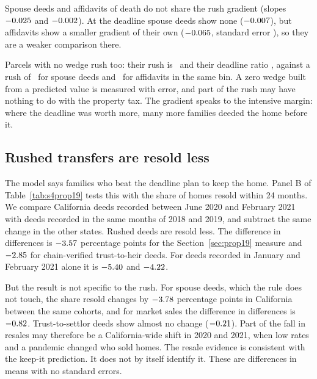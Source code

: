 Spouse deeds and affidavits of death do not share the rush gradient (slopes $-0.025$ and $-0.002$). At the deadline spouse deeds show none ($-0.007$), but affidavits show a smaller gradient of their own ($-0.065$, standard error \RTWODeadlineSlopeAffidavitSE), so they are a weaker comparison there.

Parcels with no wedge rush too: their rush is \RTWORushMainZero\ and their deadline ratio \RTWODeadlineMainZero, against a rush of \RTWORushSpouseZero\ for spouse deeds and \RTWORushAffidavitZero\ for affidavits in the same bin. A zero wedge built from a predicted value is measured with error, and part of the rush may have nothing to do with the property tax. The gradient speaks to the intensive margin: where the deadline was worth more, many more families deeded the home before it.

\subsection{Rushed transfers are resold less}\label{subsec:resale}

The model says families who beat the deadline plan to keep the home. Panel B of Table~\ref{tab:s4prop19} tests this with the share of homes resold within 24 months. We compare California deeds recorded between June 2020 and February 2021 with deeds recorded in the same months of 2018 and 2019, and subtract the same change in the other states. Rushed deeds are resold less. The difference in differences is $-3.57$ percentage points for the Section~\ref{sec:prop19} measure and $-2.85$ for chain-verified trust-to-heir deeds. For deeds recorded in January and February 2021 alone it is $-5.40$ and $-4.22$.



But the result is not specific to the rush. For spouse deeds, which the rule does not touch, the share resold changes by $-3.78$ percentage points in California between the same cohorts, and for market sales the difference in differences is $-0.82$. Trust-to-settlor deeds show almost no change ($-0.21$). Part of the fall in resales may therefore be a California-wide shift in 2020 and 2021, when low rates and a pandemic changed who sold homes. The resale evidence is consistent with the keep-it prediction. It does not by itself identify it. These are differences in means with no standard errors.

